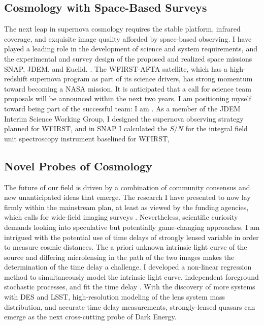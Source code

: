 \documentclass{article}
\begin{document}
\subsection{Cosmology with Space-Based Surveys}
The next leap in supernova cosmology requires the stable platform, infrared coverage, and exquisite image
quality afforded by space-based observing.  I have played a leading role in the development
of science and system requirements, and the experimental and survey design of the proposed
and realized space missions SNAP, JDEM, and Euclid.
\cite{2006PASP..118..205D, 2011PASP..123..470S, 2013Fourspring, 2014arXiv1409.8562A}.
The WFIRST-AFTA satellite, which has a high-redshift supernova program as part of its science 
drivers, has strong momentum toward becoming a NASA mission.  It is anticipated that a call for science team
proposals will be announced within the next two years.  I am positioning myself toward being part of
the successful team: I am .  As a member of the JDEM Interim Science Working Group, I designed the
supernova observing strategy planned for WFIRST, and in SNAP I calculated the $S/N$ for the integral
field unit spectroscopy instrument baselined for WFIRST,  

\subsection{Novel Probes of Cosmology}
The future of our field is driven by a combination of community consensus and new unanticipated
ideas that emerge.  The research I have presented to now lay firmly within the
mainstream plan, at least as viewed by the funding agencies, which calls for wide-field imaging surveys
\cite{2013arXiv1309.5386D,2013arXiv1309.5382K}.
Nevertheless, scientific curiosity demands looking into speculative but potentially game-changing
approaches.  I am intrigued with the potential use of time delays of strongly lensed variable in order
to measure cosmic distances.  The a priori unknown intrinsic light curve of the source and differing microlensing
in the path of the two images makes the determination of the time delay a challenge.  I developed a
non-linear regression method to simultaneously model the intrinsic light curve, independent foreground
stochastic processes, and fit the time delay \cite{2013PhRvD..87l3512H}.  With the discovery of more 
systems with DES and LSST, high-resolution modeling of the lens system mass distribution, and accurate
time delay measurements, strongly-lensed
quasars can emerge as the next cross-cutting probe of Dark Energy.
\end{document}
